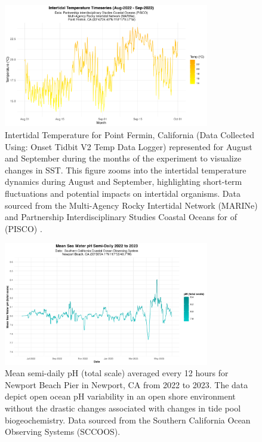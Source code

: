 \documentclass[
  12pt,
]{article}
\begin{document}
\begin{figure}[htbp]
  \centering
  \includegraphics[width=0.8\textwidth]{Images/experiment_temp_timeseries_plot.png}
  \caption{Intertidal Temperature for Point Fermin, California (Data Collected Using: Onset Tidbit V2 Temp Data Logger) represented for August and September during the months of the experiment to visualize changes in SST. This figure zooms into the intertidal temperature dynamics during August and September, highlighting short-term fluctuations and potential impacts on intertidal organisms. Data sourced from the Multi-Agency Rocky Intertidal Network (MARINe) and Partnership Interdisciplinary Studies Coastal Oceans for of (PISCO) \citep{marine_pisco_burnaford_2023}.}
  \label{fig:intertidal-timeseries-zoom}
\end{figure}

\begin{figure}[htbp]
  \centering
  \includegraphics[width=0.8\textwidth]{Images/pH_timeseries_plot.png}
  \caption{Mean semi-daily pH (total scale) averaged every 12 hours for Newport Beach Pier in Newport, CA from 2022 to 2023. The data depict open ocean pH variability in an open shore environment without the drastic changes associated with changes in tide pool biogeochemistry. Data sourced from the Southern California Ocean Observing Systems (SCCOOS).}
  \label{fig:ph-timeseries}
\end{figure}
\end{document}
